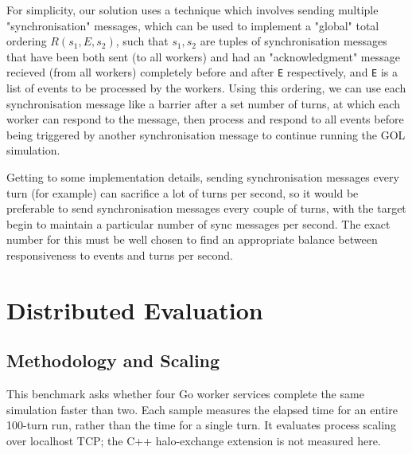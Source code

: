 \documentclass[10pt,a4paper,twocolumn]{article}
\begin{document}
For simplicity, our solution uses a technique which involves sending multiple "synchronisation"
messages, which can be used to implement a "global" total ordering $R(s_{1}, E, s_{2})$, such
that $s_{1}, s_{2}$ are tuples of synchronisation messages that have been both sent (to all workers) and had an "acknowledgment"
message recieved (from all workers) completely before and after \texttt{E} respectively, and \texttt{E}
is a list of events to be processed by the workers. Using this ordering, we can use each synchronisation
message like a barrier after a set number of turns, at which each worker can respond to the message, then
process and respond to all events before being triggered by another synchronisation message to continue running
the GOL simulation.

Getting to some implementation details, sending synchronisation messages every turn (for example)
can sacrifice a lot of turns per second,
so it would be preferable to send synchronisation messages every couple of turns, with the target
begin to maintain a particular number of sync messages per second. The exact number for this must be
well chosen to find an appropriate balance between responsiveness to events and turns per second.


\section{Distributed Evaluation}

\subsection{Methodology and Scaling}

This benchmark asks whether four Go worker services complete the same
simulation faster than two. Each sample measures the elapsed time for an
entire 100-turn run, rather than the time for a single turn. It evaluates
process scaling over localhost TCP; the C++ halo-exchange extension is not
measured here.
\end{document}
